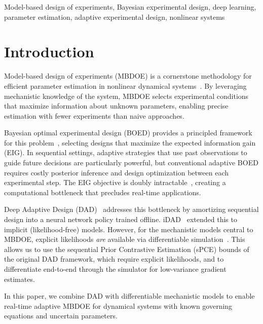 \documentclass[conference]{IEEEtran}
\begin{document}
\begin{IEEEkeywords}
Model-based design of experiments, Bayesian experimental design, deep learning, parameter estimation, adaptive experimental design, nonlinear systems
\end{IEEEkeywords}

\section{Introduction}
Model-based design of experiments (MBDOE) is a cornerstone methodology for efficient parameter estimation in nonlinear dynamical systems~\cite{franceschini,walter1997}. By leveraging mechanistic knowledge of the system, MBDOE selects experimental conditions that maximize information about unknown parameters, enabling precise estimation with fewer experiments than naive approaches.

Bayesian optimal experimental design (BOED) provides a principled framework for this problem~\cite{lindley1956}, selecting designs that maximize the expected information gain (EIG). In sequential settings, adaptive strategies that use past observations to guide future decisions are particularly powerful, but conventional adaptive BOED requires costly posterior inference and design optimization between each experimental step. The EIG objective is doubly intractable~\cite{rainforth2018nesting}, creating a computational bottleneck that precludes real-time applications.

Deep Adaptive Design (DAD)~\cite{foster2021} addresses this bottleneck by amortizing sequential design into a neural network policy trained offline. iDAD~\cite{ivanova2021implicit} extended this to implicit (likelihood-free) models.
However, for the mechanistic models central to MBDOE, explicit likelihoods \emph{are} available via differentiable simulation~\cite{rackauckas}. This allows us to use the sequential Prior Contrastive Estimation (sPCE) bounds of the original DAD framework, which require explicit likelihoods, and to differentiate end-to-end through the simulator for low-variance gradient estimates.

In this paper, we combine DAD with differentiable mechanistic models to enable real-time adaptive MBDOE for dynamical systems with known governing equations and uncertain parameters.
\end{document}
